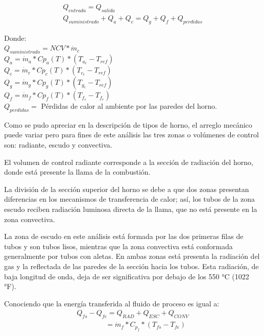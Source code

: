 \begin{equation}
    \label{eq:balance-global}
    \begin{gathered}
    Q_{entrada} = Q_{salida}\\
    Q_{suministrado} + Q_{a} + Q_{c} = 
    Q_{g} + Q_{f} + Q_{perdidas}
    \end{gathered}
\end{equation}
\par Donde:\\
$Q_{suministrado} = NCV * \dot m_{c}$\\
$Q_{a} = \dot m_{a} * Cp_{a}(T) * (T_{a_e} - T_{ref})$\\
$Q_{c} = \dot m_{c} * Cp_{c}(T) * (T_{c_e} - T_{ref})$\\
$Q_{g} = \dot m_{g} * Cp_{g}(T) * (T_{g_c} - T_{ref})$\\
$Q_{f} = \dot m_{f} * Cp_{f}(T) * (T_{f_s} - T_{f_e})$\\
$Q_{perdidas} =$ Pérdidas de calor al ambiente por las paredes del horno.
\par Como se pudo apreciar en la descripción de tipos de horno, el arreglo mecánico puede variar pero para fines de este análisis las tres zonas o volúmenes de control son: radiante, escudo y convectiva. 
\par El volumen de control radiante corresponde a la sección de radiación del horno, donde está presente la llama de la combustión.
\par La división de la sección superior del horno se debe a que dos zonas presentan diferencias en los mecanismos de transferencia de calor; así, los tubos de la zona escudo reciben radiación luminosa directa de la llama, que no está presente en la zona convectiva.
\par La zona de escudo en este análisis está formada por las dos primeras filas de tubos y son tubos lisos, mientras que la zona convectiva está conformada generalmente por tubos con aletas. En ambas zonas está presenta la radiación del gas y la reflectada de las paredes de la sección hacia los tubos. Esta radiación, de baja longitud de onda, deja de ser significativa por debajo de los 550 °C (1022 °F).
\par Conociendo que la energía transferida al fluido de proceso es igual a:
\begin{equation}
    \begin{gathered}
    Q_{fs} - Q_{fe} = Q_{RAD} + Q_{ESC} + Q_{CONV}\\
    \quad\quad\quad\quad = \dot m_f * C_{p_f} * (T_{fs} - T_{fe})
    \end{gathered}
\end{equation}
